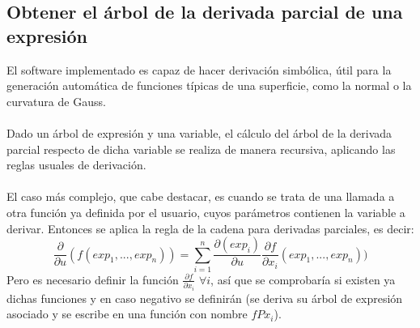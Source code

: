 \subsection*{Obtener el árbol de la derivada parcial de una expresión}
El software implementado es capaz de hacer derivación simbólica, útil para la generación automática de funciones típicas de una superficie, como la normal o la curvatura de Gauss.\\
\\Dado un árbol de expresión y una variable, el cálculo del árbol de la derivada parcial respecto de dicha variable se realiza de manera recursiva, aplicando las reglas usuales de derivación. \\
\\El caso más complejo, que cabe destacar, es cuando se trata de una llamada a otra función ya definida por el usuario, cuyos parámetros contienen la variable a derivar. Entonces se aplica la regla de la cadena para derivadas parciales, es decir:
$$\frac{\partial}{\partial u}(f(exp_1, ..., exp_n)) = \sum_{i=1}^{n} \frac{\partial (exp_i)}{\partial u} \frac{\partial f}{\partial x_i}(exp_1, ..., exp_n))$$
Pero es necesario definir la función $\frac{\partial f}{\partial x_i}$ $\forall i$, así que se comprobaría si existen ya dichas funciones y en caso negativo se definirán (se deriva su árbol de expresión asociado y se escribe en una función con nombre $fPx_i$).

